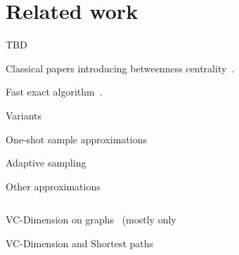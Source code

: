 \section{Related work}\label{sec:prevwork}
\XXX TBD

Classical papers introducing betweenness
centrality~\citep{Anthonisse71,Freeman77}.

Fast exact algorithm~\citep{Brandes01}.

Variants~\citep{Brandes08,DolevEP10,KourtellisASIT12,PfefferC12}

One-shot sample approximations~\citep{BrandesP07,EppsteinW04,GeisbergerSS08,JacobKLPT05}

Adaptive sampling~\citep{BaderKMM07,LimMRT11,MaiyaBW10}

Other approximations~\citep{GkorouPE10,PrountzosP13,SaryuceSKC13}

$ $

VC-Dimension on graphs~\citep{AnthonyBC95,KranakisKRUW97,MubayiZ07,YcartR07}
(mostly only~\citep{KranakisKRUW97}

VC-Dimension and Shortest paths~\citep{AbrahamDFGW11}

